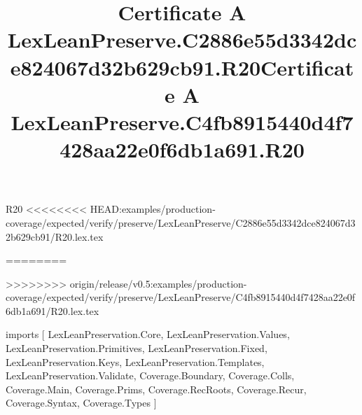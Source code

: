 \begin{lexlean}{R20}
<<<<<<<< HEAD:examples/production-coverage/expected/verify/preserve/LexLeanPreserve/C2886e55d3342dce824067d32b629cb91/R20.lex.tex
\title{Certificate A LexLeanPreserve.C2886e55d3342dce824067d32b629cb91.R20}
========
\title{Certificate A LexLeanPreserve.C4fb8915440d4f7428aa22e0f6db1a691.R20}
>>>>>>>> origin/release/v0.5:examples/production-coverage/expected/verify/preserve/LexLeanPreserve/C4fb8915440d4f7428aa22e0f6db1a691/R20.lex.tex
\begin{coremodule}
imports [
  LexLeanPreservation.Core,
  LexLeanPreservation.Values,
  LexLeanPreservation.Primitives,
  LexLeanPreservation.Fixed,
  LexLeanPreservation.Keys,
  LexLeanPreservation.Templates,
  LexLeanPreservation.Validate,
  Coverage.Boundary,
  Coverage.Colls,
  Coverage.Main,
  Coverage.Prims,
  Coverage.RecRoots,
  Coverage.Recur,
  Coverage.Syntax,
  Coverage.Types
]


\end{coremodule}
\end{lexlean}
